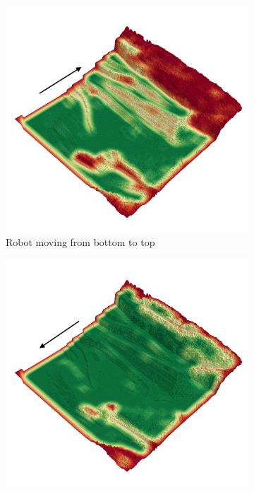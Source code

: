 \documentclass[../document.tex]{subfiles}
\begin{document}
\begin{figure}[H]
\centering
\begin{subfigure}[b]{0.45\textwidth}
  \includegraphics[width=\linewidth]{../img/4/traversability/quarry/-270.png} 
  \caption{Robot moving from bottom to top} 
  \label{fig: quarry-b2t}
\end{subfigure}
\begin{subfigure}[b]{0.45\textwidth}
    \includegraphics[width=\linewidth]{../img/4/traversability/quarry/-90.png}

\end{subfigure}
\end{figure}
\end{document}
